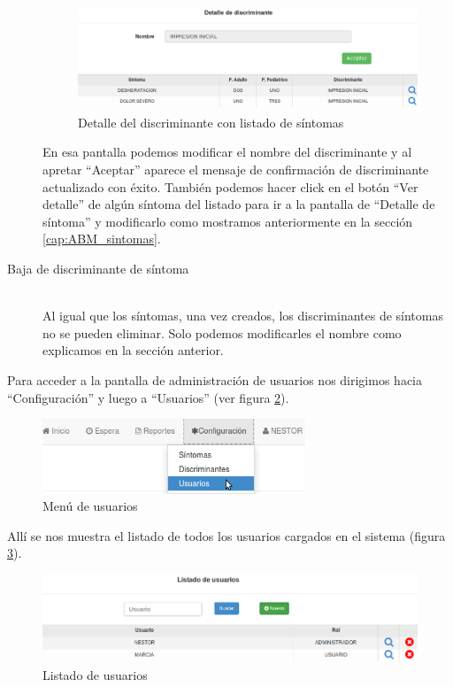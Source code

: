 \begin{description}
\begin{figure}
\centerline{\includegraphics[width=1\textwidth]{listado_sintomas_de_discriminante.png}}
\caption{Detalle del discriminante con listado de síntomas}
\label{fig:detalle_discriminante}
\end{figure}
En esa pantalla podemos modificar el nombre del discriminante y al apretar ``Aceptar'' aparece el mensaje de confirmación de discriminante actualizado con éxito. También podemos hacer click en el botón ``Ver detalle'' de algún síntoma del listado para ir a la pantalla de ``Detalle de síntoma'' y modificarlo como mostramos anteriormente en la sección \ref{cap:ABM_sintomas}.

\item[Baja de discriminante de síntoma] \mbox{} \\
Al igual que los síntomas, una vez creados, los discriminantes de síntomas no se pueden eliminar. Solo podemos modificarles el nombre como explicamos en la sección anterior.
\end{description}

\label{ABM_usuarios}
Para acceder a la pantalla de administración de usuarios nos dirigimos hacia ``Configuración'' y luego a ``Usuarios'' (ver figura \ref{fig:menu_usuarios}).
\begin{figure}
\centerline{\includegraphics[width=0.7\textwidth]{menu_usuarios.png}}
\caption{Menú de usuarios}
\label{fig:menu_usuarios}
\end{figure}
Allí se nos muestra el listado de todos los usuarios cargados en el sistema (figura \ref{fig:listado_usuarios}).
\begin{figure}
\centerline{\includegraphics[width=1\textwidth]{listado_usuarios.png}}
\caption{Listado de usuarios}
\label{fig:listado_usuarios}
\end{figure}

